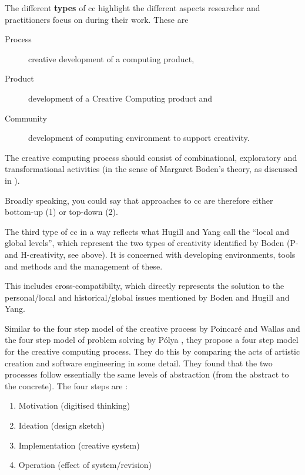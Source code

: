 The different \textbf{types} of \gls{cc} highlight the different aspects researcher and practitioners focus on during their work. These are

\begin{description}
  \item [Process]  creative development of a computing product,
  \item [Product] development of a Creative Computing product and
  \item [Community] development of computing environment to support creativity.
\end{description}

The creative computing process should consist of combinational, exploratory and transformational activities (in the sense of Margaret Boden’s theory, as discussed in ).

\begin{draft}
  Broadly speaking, you could say that approaches to \gls{cc} are therefore either bottom-up (1) or top-down (2).
\end{draft}

The third type of \gls{cc} in a way reflects what Hugill and Yang call the ``local and global levels'', which represent the two types of creativity identified by Boden (P- and H-creativity, see above). It is concerned with developing environments, tools and methods and the management of these.

\begin{draft}
  This includes cross-compatibilty, which directly represents the solution to the personal/local and historical/global issues mentioned by Boden and Hugill and Yang.
\end{draft}

Similar to the four step model of the creative process by Poincaré and Wallas \autocite{Poincare2001, Wallas1926} and the four step model of problem solving by Pólya \autocite{Polya1957}, they propose a four step model for the creative computing process. They do this by comparing the acts of artistic creation and software engineering in some detail. They found that the two processes follow essentially the same levels of abstraction (from the abstract to the concrete). The four steps are \autocite[p.15]{Hugill2013c}:

\begin{enumerate}
  \item Motivation (digitised thinking)
  \item Ideation (design sketch)
  \item Implementation (creative system)
  \item Operation (effect of system/revision)
\end{enumerate}


